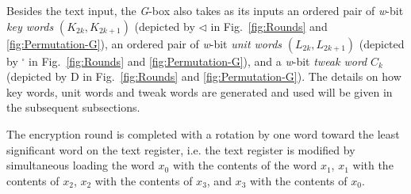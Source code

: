 \documentclass[a4paper,oneside,english]{amsart}
\numberwithin{equation}{section}
\numberwithin{figure}{section}
\begin{document}
Besides the text input, the \emph{G}-box also takes as its inputs
an ordered pair of \emph{w}-bit \emph{key words} $(K{}_{2k},K{}_{2k+1})$
(depicted by $\triangleleft$ in Fig.~\ref{fig:Rounds} and \ref{fig:Permutation-G}),
an ordered pair of \emph{w}-bit \emph{unit words} $(L_{2k},L_{2k+1})$
(depicted by $^{\square}$ in Fig.~\ref{fig:Rounds} and \ref{fig:Permutation-G}),
and a \emph{w}-bit \emph{tweak word} $C_{k}$ (depicted by \textsf{\scriptsize D}
in Fig.~\ref{fig:Rounds} and \ref{fig:Permutation-G}). The details
on how key words, unit words and tweak words are generated and used
will be given in the subsequent subsections.

The encryption round is completed with a rotation by one word toward
the least significant word on the text register, i.e. the text register
is modified by simultaneous loading the word $x_{0}$ with the contents
of the word $x_{1}$, $x_{1}$ with the contents of $x_{2}$, $x_{2}$
with the contents of $x_{3}$, and $x_{3}$ with the contents of $x_{0}$.
\end{document}
